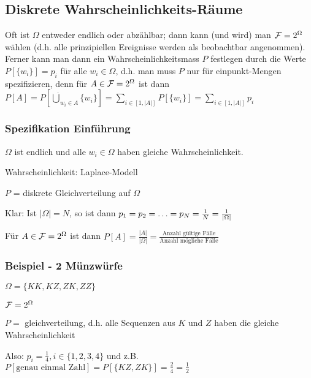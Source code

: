 \subsection{Diskrete Wahrscheinlichkeits-Räume}
Oft ist $\Omega$ entweder endlich oder abzählbar; dann kann (und wird) man $\mathcal{F} = 2^\Omega$ wählen (d.h. alle prinzipiellen Ereignisse werden als beobachtbar angenommen).\\
Ferner kann man dann ein Wahrscheinlichkeitsmass $P$ festlegen durch die Werte $P[\{w_i\}] = p_i$ für alle $w_i \in \Omega$, d.h. man muss $P$ nur für einpunkt-Mengen spezifizieren, denn für $A \in \mathcal{F} = 2^\Omega$ ist dann $P[A] = P[\dot\bigcup_{w_i \in A}\{w_i\}] = \sum_{i \in [1, |A|]}P[\{w_i\}] = \sum_{i \in [1, |A|]}p_i$

\subsubsection{Spezifikation Einführung}
$\Omega$ ist endlich und alle $w_i \in \Omega$ haben gleiche Wahrscheinlichkeit.
\enumstart
	\item Wahrscheinlichkeit: Laplace-Modell
	\item $P$ = diskrete Gleichverteilung auf $\Omega$
	\item Klar: Ist $|\Omega| = N$, so ist dann $p_1 = p_2 = \mathellipsis = p_N = \frac{1}{N} = \frac{1}{|\Omega|}$
	\item Für $A \in \mathcal{F} = 2^\Omega$ ist dann $P[A] = \frac{|A|}{|\Omega|} = \frac{\text{Anzahl gültige Fälle}}{\text{Anzahl mögliche Fälle}}$
\enumend

\subsubsection{Beispiel - 2 Münzwürfe}
\enumstart
	\item $\Omega = \{KK, KZ, ZK, ZZ\}$
	\item $\mathcal{F} = 2^\Omega$
	\item $P =$ gleichverteilung, d.h. alle Sequenzen aus $K$ und $Z$  haben die gleiche Wahrscheinlichkeit
	\item Also: $p_i = \frac{1}{4}, i \in \{1,2,3,4\}$ und z.B. $P[\text{genau einmal Zahl}] = P[\{KZ, ZK\}] = \frac{2}{4} = \frac{1}{2}$
\enumend

